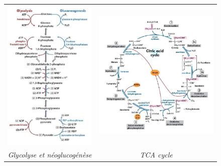 \begin{figure}
\begin{tabular}{cc}
        \includegraphics[width =8 cm]{Images/3.PNG} & \includegraphics[width =8 cm]{Images/4.PNG} \\
        \textit{Glycolyse et néoglucogénèse}   &   \textit{TCA cycle} \\
    \end{tabular}
\end{figure}

